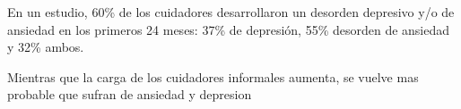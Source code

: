 \documentclass{report}
\begin{document}
	

En un estudio, 60\% de los cuidadores desarrollaron un desorden depresivo y/o de ansiedad en los primeros 24 meses: 37\% de depresi\'on, 55\% desorden de ansiedad y 32\% ambos. \citep{Joling2014}


Mientras que la carga de los cuidadores informales aumenta, se vuelve mas probable que sufran de ansiedad y depresion \citep{Denno20131731}
        {\normalsize
		
                
        }
\end{document}
